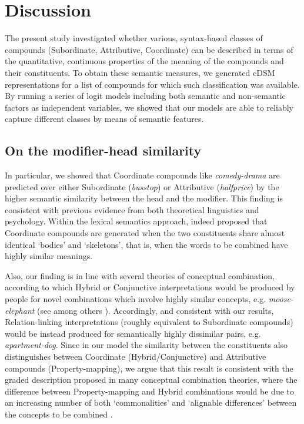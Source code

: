 \documentclass[output=paper]{langsci/langscibook}
\begin{document}
\section{Discussion}
\label{sec:pez:discussion}

The present study investigated whether various, syntax-based classes of compounds (Subordinate, Attributive, Coordinate) can be described in terms of the quantitative, continuous properties of the meaning of the compounds and their constituents. To obtain these semantic measures, we generated cDSM representations for a list of compounds for which such classification was available. By running a series of logit models including both semantic and non-semantic factors as independent variables, we showed that our models are able to reliably capture different classes by means of semantic features.

\subsection{On the modifier-head similarity}

In particular, we showed that Coordinate compounds like \emph{comedy-drama} are predicted over either Subordinate (\emph{busstop}) or Attributive (\emph{halfprice}) by the higher semantic similarity between the head and the modifier. This finding is consistent with previous evidence from both theoretical linguistics and psychology. Within the lexical semantics approach, \cite{lieber5OHC} indeed proposed that Coordinate compounds are generated when the two constituents share almost identical `bodies' and `skeletons', that is, when the words to be combined have highly similar meanings.

Also, our finding is in line with several theories of conceptual combination, according to which Hybrid or Conjunctive interpretations would be produced by people for novel combinations which involve highly similar concepts, e.g. \emph{moose-elephant} (see among others \citealt{wisniewski1996}). Accordingly, and consistent with our results, Relation-linking interpretations (roughly equivalent to Subordinate compounds) would be instead produced for semantically highly dissimilar pairs, e.g. \emph{apartment-dog}. Since in our model the similarity between the constituents also distinguishes between Coordinate (Hybrid/Conjunctive) and Attributive compounds (Property-mapping), we argue that this result is consistent with the graded description proposed in many conceptual combination theories, where the difference between Property-mapping and Hybrid combinations would be due to an increasing number of both `commonalities' and `alignable differences' between the concepts to be combined \citep{wisniewski1996}.
\end{document}
